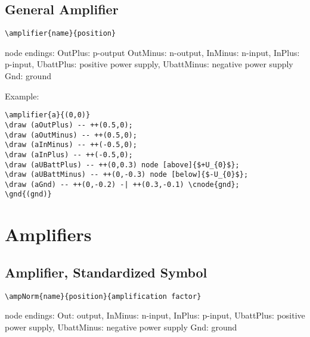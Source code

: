 \documentclass[parskip=full]{scrartcl}
\begin{document}
\subsection{General Amplifier}

\begin{verbatim}
\amplifier{name}{position}
\end{verbatim}
node endings: OutPlus: p-output OutMinus: n-output,
              InMinus: n-input, InPlus: p-input,
              UbattPlus: positive power supply,
              UbattMinus: negative power supply
              Gnd: ground

Example:\\
\begin{minipage}{0.8\textwidth}
\begin{verbatim}
\amplifier{a}{(0,0)}
\draw (aOutPlus) -- ++(0.5,0);
\draw (aOutMinus) -- ++(0.5,0);
\draw (aInMinus) -- ++(-0.5,0);
\draw (aInPlus) -- ++(-0.5,0);
\draw (aUBattPlus) -- ++(0,0.3) node [above]{$+U_{0}$};
\draw (aUBattMinus) -- ++(0,-0.3) node [below]{$-U_{0}$};
\draw (aGnd) -- ++(0,-0.2) -| ++(0.3,-0.1) \cnode{gnd};
\gnd{(gnd)}
\end{verbatim}
\end{minipage}
\begin{minipage}{0.19\textwidth}
\end{minipage}

\section{Amplifiers}

\subsection{Amplifier, Standardized Symbol}

\begin{verbatim}
\ampNorm{name}{position}{amplification factor}
\end{verbatim}
node endings: Out: output, InMinus: n-input, InPlus: p-input,
              UbattPlus: positive power supply,
              UbattMinus: negative power supply
              Gnd: ground
\end{document}
